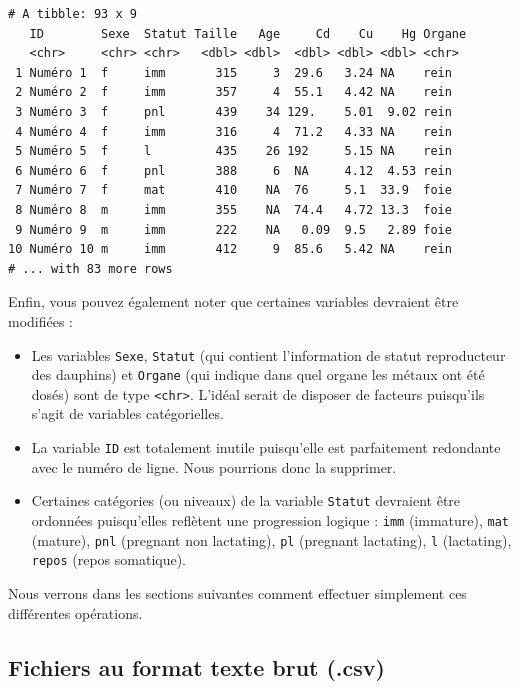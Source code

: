 \documentclass[
  letterpaper,
  DIV=11,
  numbers=noendperiod]{scrreprt}
\providecommand{\tightlist}{%
  \setlength{\itemsep}{0pt}\setlength{\parskip}{0pt}}\usepackage{longtable,booktabs,array}
\begin{document}
\begin{verbatim}
# A tibble: 93 x 9
   ID        Sexe  Statut Taille   Age     Cd    Cu    Hg Organe
   <chr>     <chr> <chr>   <dbl> <dbl>  <dbl> <dbl> <dbl> <chr> 
 1 Numéro 1  f     imm       315     3  29.6   3.24 NA    rein  
 2 Numéro 2  f     imm       357     4  55.1   4.42 NA    rein  
 3 Numéro 3  f     pnl       439    34 129.    5.01  9.02 rein  
 4 Numéro 4  f     imm       316     4  71.2   4.33 NA    rein  
 5 Numéro 5  f     l         435    26 192     5.15 NA    rein  
 6 Numéro 6  f     pnl       388     6  NA     4.12  4.53 rein  
 7 Numéro 7  f     mat       410    NA  76     5.1  33.9  foie  
 8 Numéro 8  m     imm       355    NA  74.4   4.72 13.3  foie  
 9 Numéro 9  m     imm       222    NA   0.09  9.5   2.89 foie  
10 Numéro 10 m     imm       412     9  85.6   5.42 NA    rein  
# ... with 83 more rows
\end{verbatim}

Enfin, vous pouvez également noter que certaines variables devraient
être modifiées :

\begin{itemize}
\tightlist
\item
  Les variables \texttt{Sexe}, \texttt{Statut} (qui contient
  l'information de statut reproducteur des dauphins) et \texttt{Organe}
  (qui indique dans quel organe les métaux ont été dosés) sont de type
  \texttt{\textless{}chr\textgreater{}}. L'idéal serait de disposer de
  facteurs puisqu'ils s'agit de variables catégorielles.
\item
  La variable \texttt{ID} est totalement inutile puisqu'elle est
  parfaitement redondante avec le numéro de ligne. Nous pourrions donc
  la supprimer.
\item
  Certaines catégories (ou niveaux) de la variable \texttt{Statut}
  devraient être ordonnées puisqu'elles reflètent une progression
  logique : \texttt{imm} (immature), \texttt{mat} (mature), \texttt{pnl}
  (pregnant non lactating), \texttt{pl} (pregnant lactating), \texttt{l}
  (lactating), \texttt{repos} (repos somatique).
\end{itemize}

Nous verrons dans les sections suivantes comment effectuer simplement
ces différentes opérations.

\hypertarget{plaintext}{%
\subsection{Fichiers au format texte brut (.csv)}\label{plaintext}}
\end{document}
